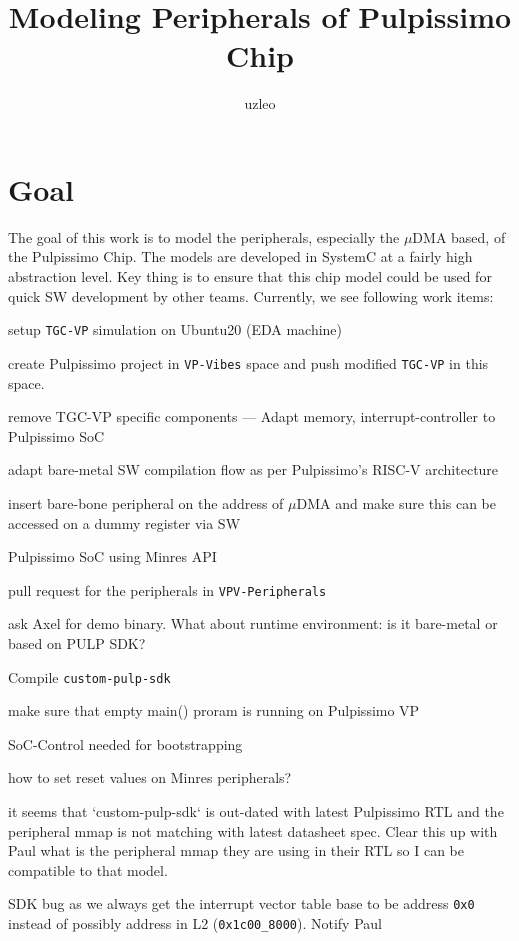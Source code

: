 \documentclass{article}
\title{Modeling Peripherals of Pulpissimo Chip}
\author{uzleo}
\date{}
\newcommand{\cmark}{\ding{51}}%
\newcommand{\done}{\rlap{$\square$}{\raisebox{2pt}{\large\hspace{1pt}\cmark}}%
\hspace{-2.5pt}}
\begin{document}
\maketitle


\section{Goal}
The goal of this work is to model the peripherals, especially the $\mu$DMA based, of the Pulpissimo Chip.
The models are developed in SystemC at a fairly high abstraction level. Key thing is to ensure that this
chip model could be used for quick SW development by other teams. Currently, we see following work items:

\begin{todolist}
 \item[\done] setup \texttt{TGC-VP} simulation on Ubuntu20 (EDA machine)
 \item[\done] create Pulpissimo project in \texttt{VP-Vibes} space and push modified \texttt{TGC-VP} in this space.
 \item[\done] remove TGC-VP specific components --- Adapt memory, interrupt-controller to Pulpissimo SoC
 \item[\done] adapt bare-metal SW compilation flow as per Pulpissimo's RISC-V architecture
 \item[\done] insert bare-bone peripheral on the address of $\mu$DMA and make sure this can be accessed on a
 dummy register via SW
 \item[\done] Pulpissimo SoC using Minres API
 \item[\done] pull request for the peripherals in \texttt{VPV-Peripherals}
 \item[\done] ask Axel for demo binary. What about runtime environment: is it bare-metal or based on PULP SDK?
 \item[\done] Compile \texttt{custom-pulp-sdk}
 \item[\done] make sure that empty main() proram is running on Pulpissimo VP
 \item[\done] SoC-Control needed for bootstrapping
 \item[\done] how to set reset values on Minres peripherals?
 \item[\done] it seems that `custom-pulp-sdk` is out-dated with latest Pulpissimo RTL and the peripheral mmap is not
 matching with latest datasheet spec. Clear this up with Paul what is the peripheral mmap they are using in their RTL
 so I can be compatible to that model.
 \item[\done] SDK bug as we always get the interrupt vector table base to be address \texttt{0x0} instead of possibly
 address in L2 (\texttt{0x1c00\_8000}). Notify Paul


\end{todolist}
\end{document}
